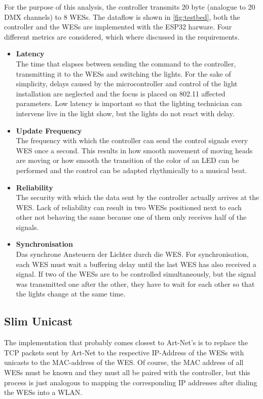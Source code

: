 For the purpose of this analysis, the controller transmits 20 byte (analogue to 20 DMX channels) to 8 WESs.
The dataflow is shown in \cref{fig:testbed}, 
both the controller and the WESs are implemented with the ESP32 harware.
Four different metrics are considered, which where discussed in the requirements.
\begin{itemize}
	\item \textbf{Latency} \\
	The time that elapses between sending the command to the controller, transmitting it to the WESs and switching the lights.
	For the sake of simplicity, delays caused by the microcontroller and
	control of the light installation are neglected and the focus is placed on 802.11 affected parameters.
	Low latency is important so that the lighting technician can intervene live in the light show,
	but the lights do not react with delay.
	\item \textbf{Update Frequency}\\
	The frequency with which the controller can send the control signals every WES once a second.
	This results in how smooth movement of moving heads are moving or how smooth the transition
	of the color of an LED can be performed
	and the control can be adapted rhythmically to a musical beat.
	\item \textbf{Reliability}\\
	The security with which the data sent by the controller actually arrives at the WES.
	Lack of reliability can result 
	in two WESs positioned next to each other not behaving the same because one of them only receives half of the signals.
	\item \textbf{Synchronisation}\\
	Das synchrone Ansteuern der Lichter durch die WES. 
	For synchronisation, each WES must wait a buffering delay until the last WES has also received a signal.
	If two of the WESs are to be controlled simultaneously, 
	but the signal was transmitted one after the other, they have to wait for each other so that the lights change at the same time.
\end{itemize}

\subsection*{Slim Unicast}

The implementation that probably comes closest to Art-Net's is to replace the TCP packets sent by Art-Net 
to the respective IP-Address of the WESs with unicasts to the MAC-address of the WES.
Of course, the MAC address of all WESs must be known and they must all be paired with the controller, but 
this process is just analogous to  mapping the corresponding IP addresses after dialing the WESs into a WLAN.

